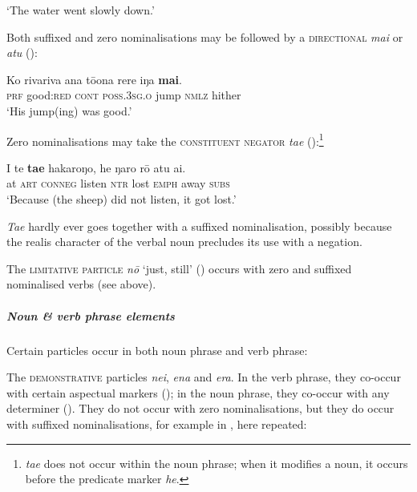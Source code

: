 \glt
‘The water went slowly down.’ \textstyleExampleref{[Gen. 8:5]}
\z

Both suffixed and zero nominalisations may be followed by a \textsc{directional} \textit{mai} or \textit{atu} ():

\ea\label{ex:3.53}
\gll Ko rivariva {\ꞌ}ana tō{\ꞌ}ona rere iŋa \textbf{mai}.\\
\textsc{prf} good:\textsc{red} \textsc{cont} \textsc{poss.3sg.o} jump \textsc{nmlz} hither\\

\glt
‘His jump(ing) was good.’ \textstyleExampleref{[R408.022]} 
\z

Zero nominalisations may take the \textsc{constituent negator} \textit{ta{\ꞌ}e} ():\footnote{\label{fn:112}\textit{ta{\ꞌ}e} does not occur within the noun phrase; when it modifies a noun, it occurs before the predicate marker \textit{he}.}

\ea\label{ex:3.54}
\gll {\ꞌ}I te \textbf{ta{\ꞌ}e} hakaroŋo, he ŋaro rō atu {\ꞌ}ai. \\
at \textsc{art} \textsc{conneg} listen \textsc{ntr} lost \textsc{emph} away \textsc{subs} \\

\glt
‘Because (the sheep) did not listen, it got lost.’ \textstyleExampleref{[R490.005]} 
\z

\textit{Ta{\ꞌ}e} hardly ever goes together with a suffixed nominalisation, possibly because the realis character of the verbal noun precludes its use with a negation.

The \textsc{limitative particle} \textit{nō} ‘just, still’ () occurs with zero and suffixed nominalised verbs (see  above).

\subparagraph{Noun \& verb phrase elements} Certain particles occur in both noun phrase and verb phrase:

The \textsc{demonstrative} particles \textit{nei}, \textit{ena} and \textit{era}. In the verb phrase, they co-occur with certain aspectual markers (); in the noun phrase, they co-occur with any determiner (). They do not occur with zero  nominalisations, but they do occur with suffixed nominalisations, for example in , here repeated:

